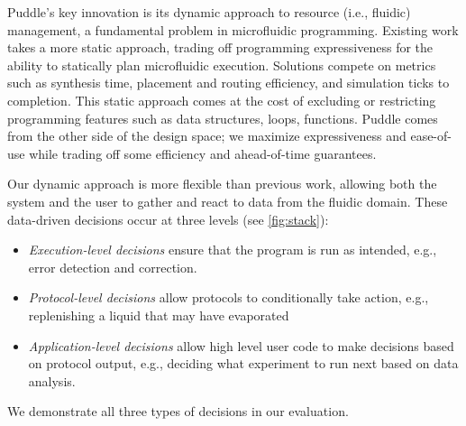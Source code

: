 \documentclass{jpaper}
\newcommand\karin[1]{\todo[color=green!80]{\sf #1}}
\begin{document}
Puddle's key innovation is its dynamic approach to resource (i.e., fluidic) management, a fundamental problem in microfluidic programming.
Existing work takes a more static approach, trading off programming expressiveness for the ability to statically plan microfluidic execution.
Solutions compete on metrics such as synthesis time, placement and routing efficiency, and simulation ticks to completion.
This static approach comes at the cost of excluding or restricting programming features such as data structures, loops, functions.
Puddle comes from the other side of the design space; we maximize expressiveness and ease-of-use while trading off some efficiency and ahead-of-time guarantees.


Our dynamic approach is more flexible than previous work, allowing both the system and the user to gather and react to data from the fluidic domain.
These data-driven decisions occur at three levels (see \autoref{fig:stack}):
\begin{itemize}
\item \emph{Execution-level decisions} ensure that the program is run as intended, e.g., error detection and correction.
\item \emph{Protocol-level decisions} allow protocols to conditionally take action, e.g., replenishing a liquid that may have evaporated
\item \emph{Application-level decisions} allow high level user code to make decisions based on protocol output, e.g., deciding what experiment to run next based on data analysis.
\end{itemize}
We demonstrate all three types of decisions in our evaluation.
\end{document}
